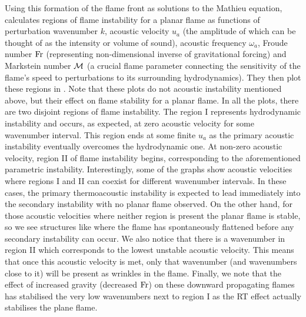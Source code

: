 Using this formation of the flame front as solutions to the Mathieu equation, \cite{searby1991ParametricAcousticInstability} calculates regions of flame instability for a planar flame as functions of perturbation wavenumber $k$, acoustic velocity $u_a$ (the amplitude of which can be thought of as the intensity or volume of sound), acoustic frequency $ω_a$, Froude number $\mathrm{Fr}$ (representing non-dimensional inverse of gravitational forcing) and Markstein number $\mathcal{M}$ (a crucial flame parameter connecting the sensitivity of the flame's speed to perturbations to its surrounding hydrodynamics). They then plot these regions in . Note that these plots do not acoustic instability mentioned above, but their effect on flame stability for a planar flame. In all the plots, there are two disjoint regions of flame instability. The region I represents hydrodynamic instability and occurs, as expected, at zero acoustic velocity for some wavenumber interval. This region ends at some finite $u_a$ as the primary acoustic instability eventually overcomes the hydrodynamic one. At non-zero acoustic velocity, region II of flame instability begins, corresponding to the aforementioned parametric instability. Interestingly, some of the graphs show acoustic velocities where regions I and II can coexist for different wavenumber intervals. In these cases, the primary thermoacoustic instability is expected to lead immediately into the secondary instability with no planar flame observed. On the other hand, for those acoustic velocities where neither region is present the planar flame is stable, so we see structures like  where the flame has spontaneously flattened before any secondary instability can occur. We also notice that there is a wavenumber in region II which corresponds to the lowest unstable acoustic velocity. This means that once this acoustic velocity is met, only that wavenumber (and wavenumbers close to it) will be present as wrinkles in the flame. Finally, we note that the effect of increased gravity (decreased $\mathrm{Fr}$) on these downward propagating flames has stabilised the very low wavenumbers next to region I as the RT effect actually stabilises the plane flame.

